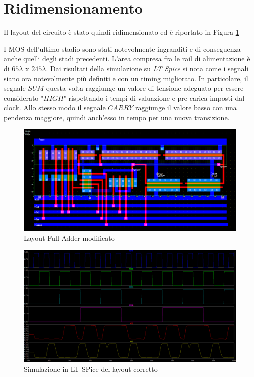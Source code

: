 \documentclass[11pt]{article} %
\begin{document}
\section{Ridimensionamento}
Il layout del circuito è stato quindi ridimensionato ed è riportato in Figura \ref{fig:Layout2}

I MOS dell'ultimo stadio sono stati notevolmente ingranditi e di conseguenza anche quelli degli stadi precedenti.
L'area compresa fra le rail di alimentazione è di $65\lambda$ x $245 \lambda$.
Dai risultati della simulazione su \emph{LT Spice} si nota come i segnali siano ora notevolmente più definiti e con un timing migliorato.
In particolare, il segnale $SUM$ questa volta raggiunge un valore di tensione adeguato per essere considerato "$HIGH$" rispettando i tempi di valuazione e pre-carica imposti dal clock.
Allo stesso modo il segnale $CARRY$ raggiunge il valore basso con una pendenza maggiore, quindi anch'esso in tempo per una nuova transizione.

 \begin{figure}[h]
  \includegraphics[width=\linewidth]{Layout2.png}
  \caption{Layout Full-Adder modificato}
  \label{fig:Layout2}
\end{figure}
\begin{figure}[h]
  \includegraphics[width=\linewidth]{LT2.png}
  \caption{Simulazione in LT SPice del layout corretto}
  \label{fig:LT2}
\end{figure}
\end{document}
